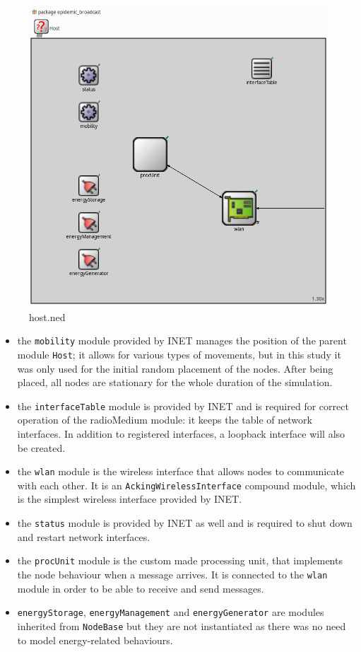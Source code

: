 \begin{figure}[H]
    \begin{center}
        \includegraphics[scale=0.35]{img/host.png}
        \caption{host.ned}
        \label{fig:hostOmnet}
    \end{center}
    \vspace*{-0.8cm}
\end{figure}
\begin{itemize}
    \item the \texttt{mobility} module provided by INET manages the position of
    the parent module \texttt{Host}; it allows for various types of movements,
	but in this study it was only used for the initial random placement of the
    nodes. After being placed, all nodes are stationary for the whole duration
	of the simulation.
    \item the \texttt{interfaceTable} module is provided by INET and is required
    for correct operation of the radioMedium module: it keeps the table of
	network interfaces. In addition to registered interfaces, a loopback
	interface will also be created.
    \item the \texttt{wlan} module is the wireless interface that allows nodes
    to communicate with each other. It is an \texttt{AckingWirelessInterface}
    compound module, which is the simplest wireless interface provided by INET.
    \item the \texttt{status} module is provided by INET as well and is required
    to shut down and restart network interfaces.
    \item the \texttt{procUnit} module is the custom made processing unit, that
    implements the node behaviour when a message arrives. It is connected to the
    \texttt{wlan} module in order to be able to receive and send messages.
    \item \texttt{energyStorage}, \texttt{energyManagement} and
    \texttt{energyGenerator} are modules inherited from \texttt{NodeBase} but
    they are not instantiated as there was no need to model energy-related
    behaviours.
\end{itemize}
